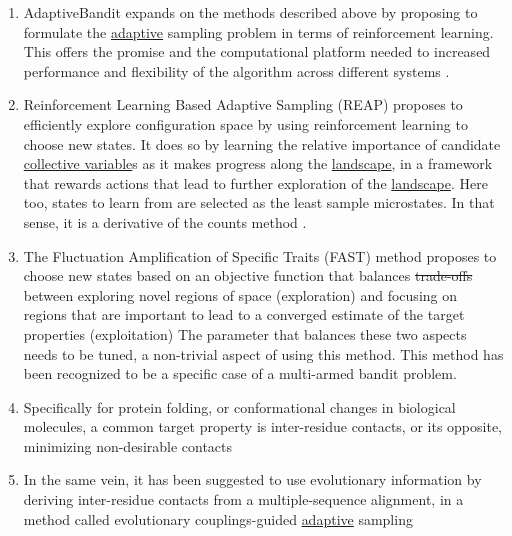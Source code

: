 \documentclass[9pt,review]{livecoms}
\providecommand{\DIFaddtex}[1]{{\protect\color{blue}\uwave{#1}}} %
\providecommand{\DIFdeltex}[1]{{\protect\color{red}\sout{#1}}}                      %
\providecommand{\DIFaddbegin}{} %
\providecommand{\DIFaddend}{} %
\providecommand{\DIFdelbegin}{} %
\providecommand{\DIFdelend}{} %
\providecommand{\DIFadd}[1]{\texorpdfstring{\DIFaddtex{#1}}{#1}} %
\providecommand{\DIFdel}[1]{\texorpdfstring{\DIFdeltex{#1}}{}} %
\newcommand{\DIFscaledelfig}{0.5}
\newlength{\DIFdelgraphicswidth} %
\newlength{\DIFdelgraphicsheight} %
\newcommand{\DIFaddincludegraphics}[2][]{{\color{blue}\fbox{\DIFOincludegraphics[#1]{#2}}}} %
\newcommand{\DIFdelincludegraphics}[2][]{%
\sbox{\DIFdelgraphicsbox}{\DIFOincludegraphics[#1]{#2}}%
\settoboxwidth{\DIFdelgraphicswidth}{\DIFdelgraphicsbox} %
\settoboxtotalheight{\DIFdelgraphicsheight}{\DIFdelgraphicsbox} %
\scalebox{\DIFscaledelfig}{%
\parbox[b]{\DIFdelgraphicswidth}{\usebox{\DIFdelgraphicsbox}\\[-\baselineskip] \rule{\DIFdelgraphicswidth}{0em}}\llap{\resizebox{\DIFdelgraphicswidth}{\DIFdelgraphicsheight}{%
\setlength{\unitlength}{\DIFdelgraphicswidth}%
\begin{picture}(1,1)%
\thicklines\linethickness{2pt} %
{\color[rgb]{1,0,0}\put(0,0){\framebox(1,1){}}}%
{\color[rgb]{1,0,0}\put(0,0){\line( 1,1){1}}}%
{\color[rgb]{1,0,0}\put(0,1){\line(1,-1){1}}}%
\end{picture}%
}\hspace*{3pt}}} %
} %
\DeclareRobustCommand{\DIFaddbegin}{\DIFOaddbegin \let\includegraphics\DIFaddincludegraphics} %
\DeclareRobustCommand{\DIFaddend}{\DIFOaddend \let\includegraphics\DIFOincludegraphics} %
\DeclareRobustCommand{\DIFdelbegin}{\DIFOdelbegin \let\includegraphics\DIFdelincludegraphics} %
\DeclareRobustCommand{\DIFdelend}{\DIFOaddend \let\includegraphics\DIFOincludegraphics} %
\begin{document}
    \begin{enumerate}
    \item AdaptiveBandit expands on the methods described above by proposing to formulate the \hyperlink{ref:Adaptive} {adaptive} sampling problem in terms of reinforcement learning. This offers the promise and the computational platform needed to increased performance and flexibility of the algorithm across different systems \cite{doi:10.1021/acs.jctc.0c00205}.
    \item Reinforcement Learning Based Adaptive Sampling (REAP) proposes to efficiently explore configuration space by using reinforcement learning to choose new states. It does so by learning the relative importance of candidate \hyperlink{ref:CV} {collective variable}s as it makes progress along the \hyperlink{ref:FES} {landscape}, in a framework that rewards actions that lead to further exploration of the \hyperlink{ref:FES} {landscape}. Here too, states to learn from are selected as the least sample microstates. In that sense, it is a derivative of the counts method \cite{doi:10.1021/acs.jpcb.8b06521}.
    \item The Fluctuation Amplification of Specific Traits (FAST) method proposes to choose new states based on an objective function that balances \DIFdelbegin \DIFdel{trade-offs }\DIFdelend \DIFaddbegin \DIFadd{tradeoffs }\DIFaddend between exploring novel regions of space (exploration) and focusing on regions that are important to lead to a converged estimate of the target properties (exploitation) \cite{doi:10.1021/acs.jctc.5b00737,doi:10.1021/acs.jctc.8b00500} The parameter that balances these two aspects needs to be tuned, a non-trivial aspect of using this method. This method has been recognized to be a specific case of a multi-armed bandit problem.
    \item Specifically for protein folding, or conformational changes in biological molecules, a common target property is inter-residue contacts, or its opposite, minimizing non-desirable contacts \cite{doi:10.1063/1.5053582}\DIFaddbegin \DIFadd{.
    }\DIFaddend \item In the same vein, it has been suggested to use evolutionary information by deriving inter-residue contacts from a multiple-sequence alignment, in a method called evolutionary couplings-guided \hyperlink{ref:Adaptive} {adaptive} sampling \cite{shamsi_enhanced_2017}\DIFaddbegin \DIFadd{.
    }\DIFaddend \end{enumerate}
\end{document}
